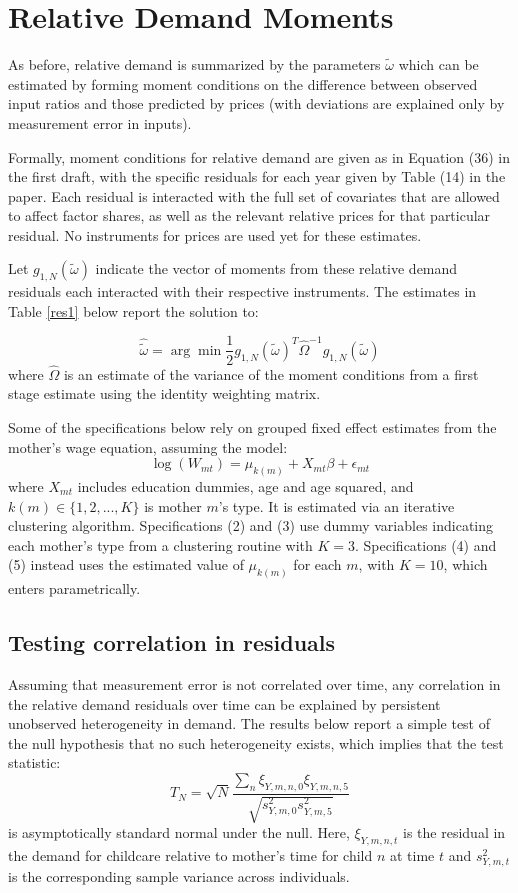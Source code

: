 \documentclass{article}
\begin{document}
\section*{Relative Demand Moments}
As before, relative demand is summarized by the parameters $\tilde{\omega}$ which can be estimated by forming moment conditions on the difference between observed input ratios and those predicted by prices (with deviations are explained only by measurement error in inputs).

Formally, moment conditions for relative demand are given as in Equation (36) in the first draft, with the specific residuals for each year given by Table (14) in the paper. Each residual is interacted with the full set of covariates that are allowed to affect factor shares, as well as the relevant relative prices for that particular residual. {\color{red}No instruments for prices are used yet for these estimates.}

Let $g_{1,N}(\tilde{\omega})$ indicate the vector of moments from these relative demand residuals each interacted with their respective instruments. The estimates in Table \ref{res1} below report the solution to:

\[ \hat{\tilde{\omega}} = \arg\min\frac{1}{2}g_{1,N}(\tilde{\omega})^{T}\hat{\Omega}^{-1}g_{1,N}(\tilde{\omega}) \]
where $\hat{\Omega}$ is an estimate of the variance of the moment conditions from a first stage estimate using the identity weighting matrix.

Some of the specifications below rely on grouped fixed effect estimates from the mother's wage equation, assuming the model:
\[ \log(W_{mt}) = \mu_{k(m)} + X_{mt}\beta + \epsilon_{mt} \]
where $X_{mt}$ includes education dummies, age and age squared, and $k(m)\in\{1,2,...,K\}$ is mother $m$'s type. It is estimated via an iterative clustering algorithm. Specifications (2) and (3) use dummy variables indicating each mother's type from a clustering routine with $K=3$. Specifications (4) and (5) instead uses the estimated value of $\mu_{k(m)}$ for each $m$, with $K=10$, which enters parametrically.

\subsection*{Testing correlation in residuals}
Assuming that measurement error is not correlated over time, any correlation in the relative demand residuals over time can be explained by persistent unobserved heterogeneity in demand. The results below report a simple test of the null hypothesis that no such heterogeneity exists, which implies that the test statistic:
\[ T_{N} = \sqrt{N}\frac{\sum_{n}\xi_{Y,m,n,0}\xi_{Y,m,n,5}}{\sqrt{s^2_{Y,m,0}s^2_{Y,m,5}}} \]
is asymptotically standard normal under the null. Here, $\xi_{Y,m,n,t}$ is the residual in the demand for childcare relative to mother's time for child $n$ at time $t$ and $s^2_{Y,m,t}$ is the corresponding sample variance across individuals.
\end{document}
